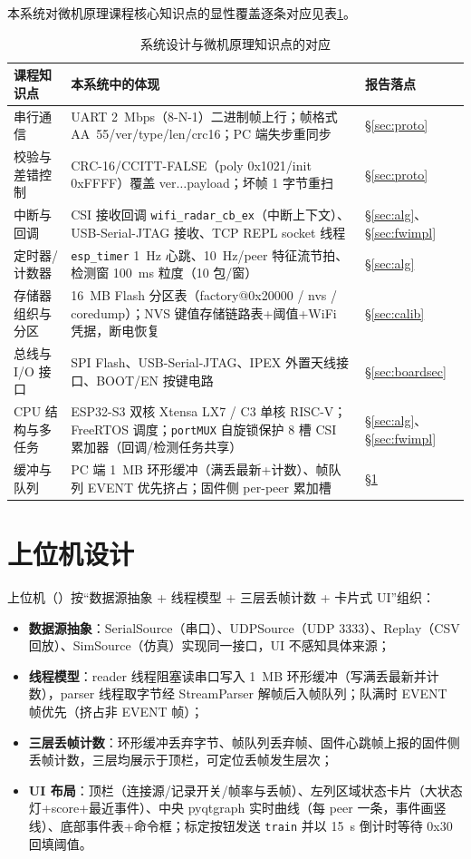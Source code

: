 本系统对微机原理课程核心知识点的显性覆盖逐条对应见表\ref{tab:kmap}。

\begin{table}[htbp]
  \centering
  \caption{系统设计与微机原理知识点的对应}
  \label{tab:kmap}
  \begin{tabular}{p{3.1cm}p{9.2cm}p{2.2cm}}
    \toprule
    \textbf{课程知识点} & \textbf{本系统中的体现} & \textbf{报告落点} \\
    \midrule
    串行通信 & UART 2~Mbps（8-N-1）二进制帧上行；帧格式 AA~55/ver/type/len/crc16；PC 端失步重同步 & \S\ref{sec:proto} \\
    校验与差错控制 & CRC-16/CCITT-FALSE（poly 0x1021/init 0xFFFF）覆盖 ver$\ldots$payload；坏帧 1 字节重扫 & \S\ref{sec:proto} \\
    中断与回调 & CSI 接收回调 \texttt{wifi\_radar\_cb\_ex}（中断上下文）、USB-Serial-JTAG 接收、TCP REPL socket 线程 & \S\ref{sec:alg}、\S\ref{sec:fwimpl} \\
    定时器/计数器 & \texttt{esp\_timer} 1~Hz 心跳、10~Hz/peer 特征流节拍、检测窗 100~ms 粒度（10 包/窗） & \S\ref{sec:alg} \\
    存储器组织与分区 & 16~MB Flash 分区表（factory@0x20000 / nvs / coredump）；NVS 键值存储链路表+阈值+WiFi 凭据，断电恢复 & \S\ref{sec:calib} \\
    总线与 I/O 接口 & SPI Flash、USB-Serial-JTAG、IPEX 外置天线接口、BOOT/EN 按键电路 & \S\ref{sec:boardsec} \\
    CPU 结构与多任务 & ESP32-S3 双核 Xtensa LX7 / C3 单核 RISC-V；FreeRTOS 调度；\texttt{portMUX} 自旋锁保护 8 槽 CSI 累加器（回调/检测任务共享） & \S\ref{sec:alg}、\S\ref{sec:fwimpl} \\
    缓冲与队列 & PC 端 1~MB 环形缓冲（满丢最新+计数）、帧队列 EVENT 优先挤占；固件侧 per-peer 累加槽 & \S\ref{sec:ui} \\
    \bottomrule
  \end{tabular}
\end{table}

\section{上位机设计}\label{sec:ui}

上位机（）按“数据源抽象 + 线程模型 + 三层丢帧计数 + 卡片式 UI”组织：

\begin{itemize}
  \item \textbf{数据源抽象}：SerialSource（串口）、UDPSource（UDP 3333）、Replay（CSV 回放）、SimSource（仿真）实现同一接口，UI 不感知具体来源；
  \item \textbf{线程模型}：reader 线程阻塞读串口写入 1~MB 环形缓冲（写满丢最新并计数），parser 线程取字节经 StreamParser 解帧后入帧队列；队满时 EVENT 帧优先（挤占非 EVENT 帧）；
  \item \textbf{三层丢帧计数}：环形缓冲丢弃字节、帧队列丢弃帧、固件心跳帧上报的固件侧丢帧计数，三层均展示于顶栏，可定位丢帧发生层次；
  \item \textbf{UI 布局}：顶栏（连接源/记录开关/帧率与丢帧）、左列区域状态卡片（大状态灯+score+最近事件）、中央 pyqtgraph 实时曲线（每 peer 一条，事件画竖线）、底部事件表+命令框；标定按钮发送 \texttt{train} 并以 15~s 倒计时等待 0x30 回填阈值。
\end{itemize}
